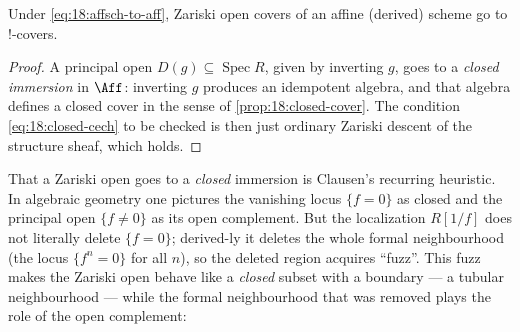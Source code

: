 \begin{proposition}
\label{prop:18:zariski}
Under \eqref{eq:18:affsch-to-aff}, Zariski open covers of an affine (derived)
scheme go to $!$-covers.
\end{proposition}

\begin{proof}
A principal open $D(g)\subseteq\operatorname{Spec}R$, given by inverting $g$, goes
to a \emph{closed immersion} in $\Aff$: inverting $g$ produces an idempotent
algebra, and that algebra defines a closed cover in the sense of
\cref{prop:18:closed-cover}. The condition \eqref{eq:18:closed-cech} to be checked
is then just ordinary Zariski descent of the structure sheaf, which holds.
\end{proof}

\begin{remark}
\label{rmk:18:fuzz}
That a Zariski open goes to a \emph{closed} immersion is Clausen's recurring
heuristic. In algebraic geometry one pictures the vanishing locus $\{f=0\}$ as
closed and the principal open $\{f\ne0\}$ as its open complement. But the
localization $R[1/f]$ does not literally delete $\{f=0\}$; derived-ly it deletes
the whole formal neighbourhood (the locus $\{f^n=0\}$ for all $n$), so the deleted
region acquires ``fuzz''. This fuzz makes the Zariski open behave like a
\emph{closed} subset with a boundary --- a tubular neighbourhood --- while the formal
neighbourhood that was removed plays the role of the open complement:
\begin{center}
\end{center}

\end{remark}
